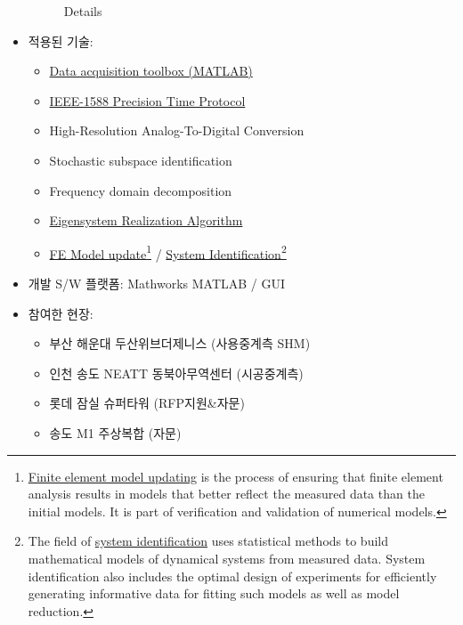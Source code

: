 \documentclass[10pt,a4paper,ragged2e]{altacv}
\begin{document}
\begin{fullwidth}
\begin{itemize}
\begin{figure}[ht]
\begin{fullwidth}
{					      \caption*{Details}
				      }
			      \end{fullwidth}
		      \end{figure}
		\item 적용된 기술:
		      \begin{itemize}
			      \item \href{http://kr.mathworks.com/products/daq/}{Data acquisition toolbox (MATLAB)}
			      \item \href{https://ko.wikipedia.org/wiki/IEEE_1588}{IEEE-1588 Precision Time Protocol}
			      \item High-Resolution Analog-To-Digital Conversion
			      \item Stochastic subspace identification
			      \item Frequency domain decomposition
			      \item \href{https://en.wikipedia.org/wiki/Eigensystem_realization_algorithm}{Eigensystem Realization Algorithm}
			      \item \href{https://en.wikipedia.org/wiki/Finite_element_updating}{FE Model update}\footnote{\href{https://en.wikipedia.org/wiki/Finite_element_updating}{Finite element model updating} is the process of ensuring that finite element analysis results in models that better reflect the measured data than the initial models. It is part of verification and validation of numerical models.} / \href{https://en.wikipedia.org/wiki/System_identification}{System Identification}\footnote{The field of \href{https://en.wikipedia.org/wiki/System_identification}{system identification} uses statistical methods to build mathematical models of dynamical systems from measured data. System identification also includes the optimal design of experiments for efficiently generating informative data for fitting such models as well as model reduction.}
		      \end{itemize}
		\item 개발 S/W 플랫폼: Mathworks MATLAB / GUI
		\item 참여한 현장:
		      \begin{itemize}
			      \item 부산 해운대 두산위브더제니스 (사용중계측 SHM)
			      \item 인천 송도 NEATT 동북아무역센터 (시공중계측)
			      \item 롯데 잠실 슈퍼타워 (RFP지원\&자문)
			      \item 송도 M1 주상복합 (자문)
		      \end{itemize}
	\end{itemize}


\end{fullwidth}
\end{document}
